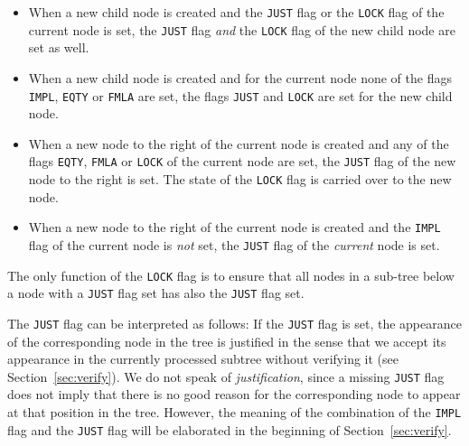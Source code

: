 \documentclass[british]{article}
\newcommand\prv{bc}
\newcommand\m[1]{\texttt{#1}}
\begin{document}
\begin{itemize}
	\item
		When a new child node is created and the \texttt{JUST} flag or the
		\texttt{LOCK} flag of the current node is set, the \texttt{JUST} flag
		\emph{and} the \texttt{LOCK} flag of the new child node are set as well. 
	\item
		When a new child node is created and for the current node none of the
		flags \texttt{IMPL}, \texttt{EQTY} or \texttt{FMLA} are set, the flags
		\texttt{JUST} and \texttt{LOCK} are set for the new child node.
	\item
		When a new node to the right of the current node is created and any of
		the flags \texttt{EQTY}, \texttt{FMLA} or \texttt{LOCK} of the current
		node are set, the \texttt{JUST} flag of the new node to the right is
		set. The state of the \texttt{LOCK} flag is carried over to the new
		node.
	\item
		When a new node to the right of the current node is created and the
		\texttt{IMPL} flag of the current node is \emph{not} set, the
		\texttt{JUST} flag of the \emph{current} node is set.
\end{itemize}

The only function of the \texttt{LOCK} flag is to ensure that all nodes in a
sub-tree below a node with a \texttt{JUST} flag set has also the \texttt{JUST}
flag set.\newline

The \texttt{JUST} flag can be interpreted as follows: If the
\texttt{JUST} flag is set, the appearance of the corresponding node in the tree
is justified in the sense that we accept its appearance in the currently
processed subtree without verifying it (see Section~\ref{sec:verify}). We do not
speak of \emph{justification}, since a missing \texttt{JUST} flag does not imply
that there is no good reason for the corresponding node to appear at that
position in the tree. However, the meaning of the combination of the
\texttt{IMPL} flag and the \texttt{JUST} flag will be elaborated in the
beginning of Section~\ref{sec:verify}.

\end{document}
